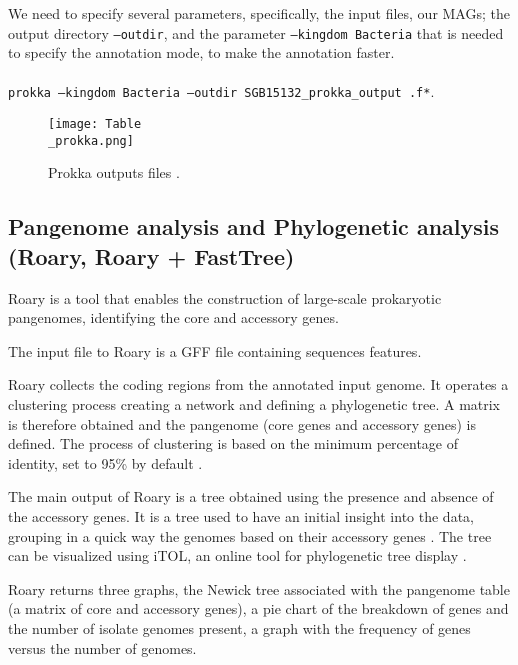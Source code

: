 \documentclass[a4paper,titlepage, oneside]{book}
\newcommand{\code}[1]{\colorbox{light-gray}{\texttt{#1}}}
\begin{document}
We need to specify several parameters, specifically, the input files, our MAGs; the output directory \code{--outdir}, and the parameter \code{--kingdom Bacteria} that is needed to specify the annotation mode, to make the annotation faster.
\\ \newline \\
\code{prokka --kingdom Bacteria --outdir SGB15132\_prokka\_output .f*}.


\begin{figure}[ht]
\centering
\texttt{[image: Table\\\_prokka.png]}
\caption{Prokka outputs files \cite{Prokka}.}
\label{fig:prokka-output}
\end{figure}

\subsection{Pangenome analysis and Phylogenetic analysis (Roary, Roary + FastTree)}

Roary is a tool that enables the construction of large-scale prokaryotic pangenomes, identifying the core and accessory genes.

The input file to Roary is a GFF file containing sequences features. 

Roary collects the coding regions from the annotated input genome. It operates a clustering process creating a network and defining a phylogenetic tree. A matrix is therefore obtained and the pangenome (core genes and accessory genes) is defined.  The process of clustering is based on the minimum percentage of identity, set to 95\% by default \cite{Roary}.

The main output of Roary is a tree obtained using the presence and absence of the accessory genes. It is a tree used to have an initial insight into the data, grouping in a quick way the genomes based on their accessory genes \cite{Roary}. The tree can be visualized using iTOL, an online tool for phylogenetic tree display \cite{iTOL}.

Roary returns three graphs, the Newick tree associated with the pangenome table (a matrix of core and accessory genes), a pie chart of the breakdown of genes and the number of isolate genomes present, a graph with the frequency of genes versus the number of genomes. \cite{Roary-outputs}
\end{document}

